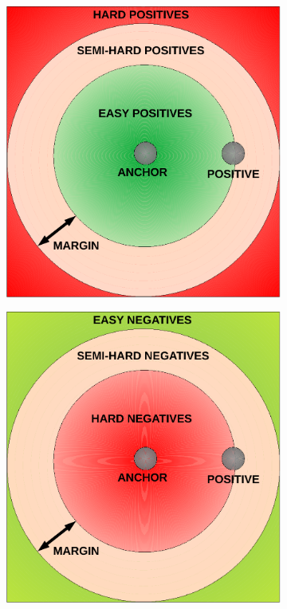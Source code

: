\begin{figure}[t]
    \centering
    \begin{subfigure}[b]{0.35\textwidth}
        \centering
        \includegraphics[width=\textwidth]{figures/theoretical_foundations/triplet_positives_categories.pdf}
        \caption[]{}
    \end{subfigure}
    \hfill
    \begin{subfigure}[b]{0.35\textwidth}
        \centering
        \includegraphics[width=\textwidth]{figures/theoretical_foundations/triplet_negatives_categories.pdf}

\end{subfigure}
\end{figure}
